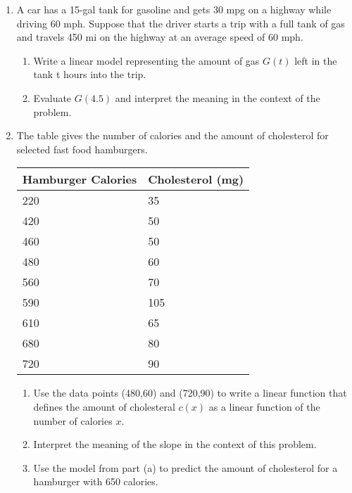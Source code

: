 \begin{enumerate}
 \item A car has a 15-gal tank for gasoline and gets 30 mpg on a highway while driving 60 mph. Suppose that the driver starts a trip with a full tank of gas and travels 450 mi on the highway at an average speed of 60 mph.
 
 \begin{enumerate}
 \item Write a linear model representing the amount of gas $G(t)$ left in the tank t hours into the trip.
 \vfill
 \vfill
 \item Evaluate $G(4.5)$ and interpret the meaning in the context of the problem.
 \vfill
 \end{enumerate}
 
 \newpage
 

\item The table gives the number of calories and the amount of cholesterol for selected fast food hamburgers.\\
\begin{table}[h]
\begin{tabular}{|l|l|}
\hline
\textbf{Hamburger Calories} & \textbf{Cholesterol (mg)} \\ \hline
220                         & 35                        \\ \hline
420                         & 50                        \\ \hline
460                         & 50                        \\ \hline
480                         & 60                        \\ \hline
560                         & 70                        \\ \hline
590                         & 105                       \\ \hline
610                         & 65                        \\ \hline
680                         & 80                        \\ \hline
720                         & 90                        \\ \hline
\end{tabular}
\end{table}
\begin{enumerate}
\item Use the data points (480,60) and (720,90) to write a linear function that defines the amount of cholesteral $c(x)$ as a linear function of the number of calories $x$.
\vfill
\item Interpret the meaning of the slope in the context of this problem.
\vfill
\item Use the model from part (a) to predict the amount of cholesterol for a hamburger with 650 calories.  
\vfill
\end{enumerate}


\end{enumerate}
